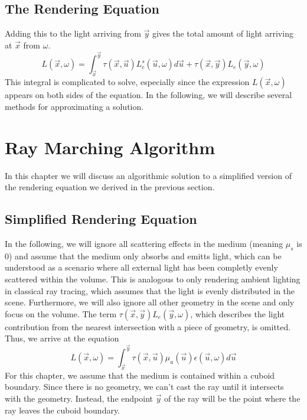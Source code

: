 \subsection{The Rendering Equation}
Adding this to the light arriving from $\vec{y}$ gives the total amount of light arriving at $\vec{x}$ from $\omega $.
\begin{equation}
L(\vec{x}, \omega ) = {\int_{\vec{x}}^{\vec{y}} \tau(\vec{x}, \vec{u})L_e^s(\vec{u}, \omega )d\vec{u}} + \tau(\vec{x}, \vec{y}) L_e(\vec{y}, \omega )
\end{equation}
This integral is complicated to solve, especially since the expression $L(\vec{x}, \omega )$ appears on both sides of the equation.
In the following, we will describe several methods for approximating a solution.




\section{Ray Marching Algorithm}
In this chapter we will discuss an algorithmic solution to a simplified version of the rendering equation we derived in the previous section.
\subsection{Simplified Rendering Equation}
In the following, we will ignore all scattering effects in the medium (meaning $\mu_s $ is 0) and assume that the medium only absorbs and emitts light, which can be understood as a scenario where all external light has been completly evenly scattered within the volume. This is analogous to only rendering ambient lighting in classical ray tracing, which assumes that the light is evenly distributed in the scene.
Furthermore, we will also ignore all other geometry in the scene and only focus on the volume. The term $\tau(\vec{x}, \vec{y}) L_e(\vec{y}, \omega )$, which describes the light contribution from the nearest intersection with a piece of geometry, is omitted.
Thus, we arrive at the equation
\begin{equation}
L(\vec{x}, \omega ) = \int_{\vec{x}}^{\vec{y}} \tau(\vec{x}, \vec{u}){\mu}_a(\vec{u})\epsilon (\vec{u}, \omega)d\vec{u}
\end{equation}
For this chapter, we assume that the medium is contained within a cuboid boundary. Since there is no geometry, we can't cast the ray until it intersects with the geometry. Instead, the endpoint $\vec{y}$ of the ray will be the point where the ray leaves the cuboid boundary.

